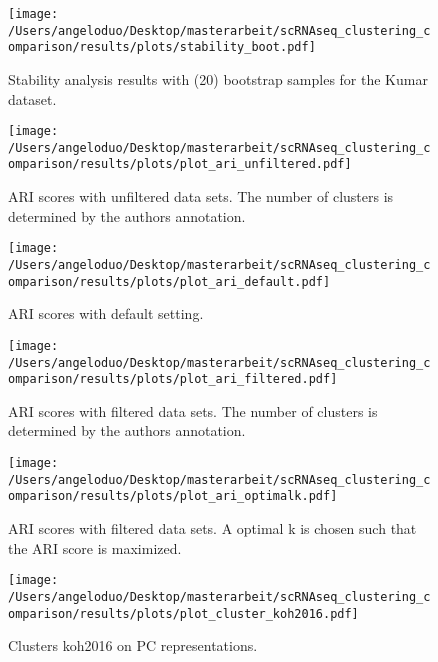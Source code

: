 \documentclass[12pt, a4paper]{article}\usepackage[]{graphicx}\usepackage[]{color}
\begin{document}
\begin{figure}[!h]
\texttt{[image: /Users/angeloduo/Desktop/masterarbeit/scRNAseq\_clustering\_comparison/results/plots/stability\_boot.pdf]}
\caption{Stability analysis results with (20) bootstrap samples for the Kumar dataset.}
\label{fig:boot}
\end{figure}


\begin{figure}[!h]
\texttt{[image: /Users/angeloduo/Desktop/masterarbeit/scRNAseq\_clustering\_comparison/results/plots/plot\_ari\_unfiltered.pdf]}
\caption{ARI scores with unfiltered data sets. The number of clusters is determined by the authors annotation. }
\label{fig:ariunfilt}
\end{figure}

\begin{figure}[!h]
\texttt{[image: /Users/angeloduo/Desktop/masterarbeit/scRNAseq\_clustering\_comparison/results/plots/plot\_ari\_default.pdf]}
\caption{ARI scores with default setting. }
\label{fig:aridef}
\end{figure}

\begin{figure}[!h]
\texttt{[image: /Users/angeloduo/Desktop/masterarbeit/scRNAseq\_clustering\_comparison/results/plots/plot\_ari\_filtered.pdf]}
\caption{ARI scores with filtered data sets.  The number of clusters is determined by the authors annotation. }
\label{fig:arifilt}
\end{figure}

\begin{figure}[!h]
\texttt{[image: /Users/angeloduo/Desktop/masterarbeit/scRNAseq\_clustering\_comparison/results/plots/plot\_ari\_optimalk.pdf]}
\caption{ARI scores with filtered data sets. A optimal k is chosen such that the ARI score is maximized. }
\label{fig:ariopt}
\end{figure}


\begin{figure}[!h]
\texttt{[image: /Users/angeloduo/Desktop/masterarbeit/scRNAseq\_clustering\_comparison/results/plots/plot\_cluster\_koh2016.pdf]}
\caption{Clusters koh2016 on PC representations. }
\label{fig:clusterkoh}
\end{figure}
\end{document}
